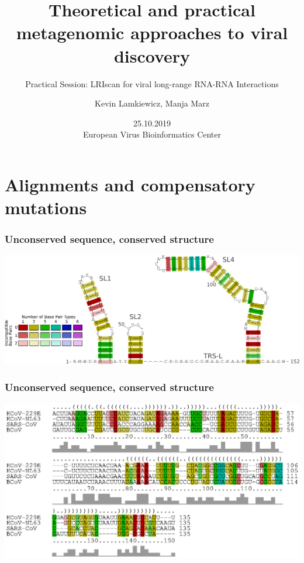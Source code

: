 

\title{Theoretical and practical metagenomic approaches to viral discovery}
\subtitle{Practical Session: LRIscan for viral long-range RNA-RNA Interactions}
\author{Kevin Lamkiewicz, Manja Marz}
\date{25.10.2019\\[1em]European Virus Bioinformatics Center}



\begin{frame}
  \maketitle
\end{frame}

\section[Alignment Recap]{Alignments and compensatory mutations}

\begin{frame}[c]\frametitle{Unconserved sequence, conserved structure}
	\includegraphics[width=\textwidth]{figures/color_code.pdf}
\end{frame}


\begin{frame}[c]\frametitle{Unconserved sequence, conserved structure}
	\includegraphics[width=\textwidth]{figures/cov_color_aln.ps}
\end{frame}


